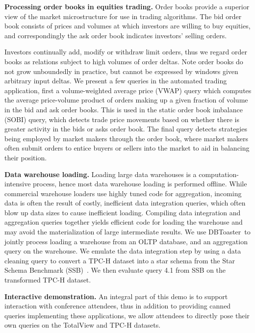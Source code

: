 \documentclass{vldb}
\newcommand{\comment}[1]{}
\newcommand{\compiler}{DBToaster}
\begin{document}
\smallskip
\noindent\textbf{Processing order books in equities trading.}
Order books provide a superior view of the market microstructure for use in
trading algorithms. The bid order book consists of prices and volumes at which
investors are willing to buy equities, and correspondingly the ask order book
indicates investors' selling orders.
\comment{
Exchanges execute trades by matching the tops of the bid and ask order
books.
}
Investors continually add, modify or withdraw limit orders, thus we regard order
books as relations subject to high volumes of order deltas. Note order books do
not grow unboundedly in practice, but cannot be expressed by windows given
arbitrary input deltas.
We present a few queries in the automated trading application, first a
volume-weighted average price (VWAP) query which computes the average
price-volume product of orders making up a given fraction of volume in the bid
and ask order books. This is used in the static order book imbalance (SOBI)
query, which detects trade price movements based on whether there is greater
activity in the bids or asks order book. The final query detects
strategies being employed by market makers through the order book, where market
makers often submit orders to entice buyers or sellers into the market to aid in
balancing their position.

\smallskip
\noindent\textbf{Data warehouse loading.}
Loading large data warehouses is a computation-intensive process, hence most data
warehouse loading is performed offline. While commercial warehouse loaders use
highly tuned code for aggregation, incoming data is often the result of costly,
inefficient data integration queries, which often blow up data sizes to cause
inefficient loading. Compiling data integration and aggregation queries together
yields efficient code for loading the warehouse and may avoid the
materialization of large intermediate results.
We use \compiler\ to jointly process loading a warehouse from an OLTP database,
and an aggregation query on the warehouse. We emulate the data integration step
by using a data cleaning query to convert a TPC-H dataset into a star schema from
the Star Schema Benchmark (SSB)~\cite{poneil-ssb:07}. We then evaluate query 4.1
from SSB on the transformed TPC-H dataset.

\smallskip
\noindent\textbf{Interactive demonstration.}
An integral part of this demo is to support interaction with conference
attendees, thus in addition to providing canned queries implementing these
applications, we allow attendees to directly pose their own queries on
the TotalView and TPC-H datasets.
\end{document}
